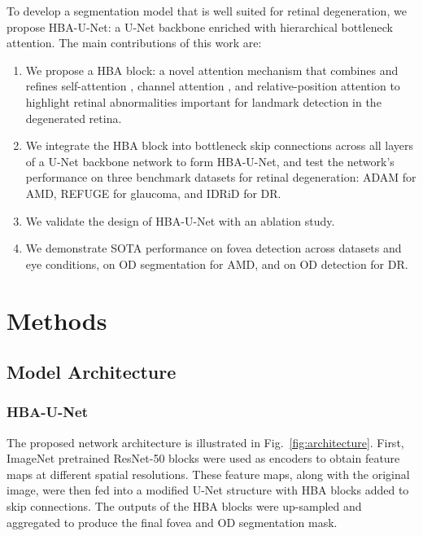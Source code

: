 \documentclass[hidelinks,runningheads]{llncs}
\begin{document}
To develop a segmentation model that is well suited for retinal degeneration, 
we propose HBA-U-Net: a U-Net backbone enriched with hierarchical bottleneck attention. 
The main contributions of this work are:
\begin{enumerate}
    \item We propose a \ac{HBA} block: a novel attention mechanism that combines and refines self-attention \cite{vaswani_attention_2017}, channel attention \cite{DBLP:journals/corr/abs-1807-06521}, and relative-position attention \cite{ramachandran_stand-alone_2019} to highlight retinal abnormalities important for landmark detection in the degenerated retina.
    \item We integrate the \ac{HBA} block into bottleneck skip connections across all layers of a U-Net backbone network to form HBA-U-Net, and test the network's performance on three benchmark datasets for retinal degeneration: ADAM \cite{fu_adam_2020} for \ac{AMD}, REFUGE \cite{ORLANDO2020101570} for glaucoma, and IDRiD \cite{PORWAL2020101561} for \ac{DR}.
    \item We validate the design of HBA-U-Net with an ablation study.
    \item We demonstrate \ac{SOTA} performance on fovea detection across datasets and eye conditions, on \ac{OD} segmentation for \ac{AMD}, and on \ac{OD} detection for \ac{DR}.
\end{enumerate}


\section{Methods}

\subsection{Model Architecture}

\subsubsection{HBA-U-Net}
The proposed network architecture is illustrated in Fig.~\ref{fig:architecture}. 
First, ImageNet pretrained ResNet-50 blocks were used as encoders to obtain feature maps at different spatial resolutions. These feature maps, along with the original image, were then fed into a modified U-Net structure \cite{ronneberger_u-net_2015,meyer_pixel-wise_2018} with \ac{HBA} blocks added to skip connections.
The outputs of the \ac{HBA} blocks were up-sampled and aggregated to produce the final fovea and \ac{OD} segmentation mask. 
\end{document}
